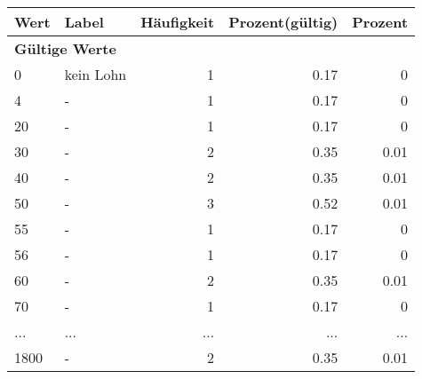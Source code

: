      \begin{longtable}{lXrrr}
     \toprule
     \textbf{Wert} & \textbf{Label} & \textbf{Häufigkeit} & \textbf{Prozent(gültig)} & \textbf{Prozent} \\
     \endhead
     \midrule
     \multicolumn{5}{l}{\textbf{Gültige Werte}}\\
        0 & \multicolumn{1}{X}{kein Lohn} & %
          \num{1} &
          \num[round-mode=places,round-precision=2]{0.17} &
          \num[round-mode=places,round-precision=2]{0} \\
        4 & \multicolumn{1}{X}{-} & %
          \num{1} &
          \num[round-mode=places,round-precision=2]{0.17} &
          \num[round-mode=places,round-precision=2]{0} \\
        20 & \multicolumn{1}{X}{-} & %
          \num{1} &
          \num[round-mode=places,round-precision=2]{0.17} &
          \num[round-mode=places,round-precision=2]{0} \\
        30 & \multicolumn{1}{X}{-} & %
          \num{2} &
          \num[round-mode=places,round-precision=2]{0.35} &
          \num[round-mode=places,round-precision=2]{0.01} \\
        40 & \multicolumn{1}{X}{-} & %
          \num{2} &
          \num[round-mode=places,round-precision=2]{0.35} &
          \num[round-mode=places,round-precision=2]{0.01} \\
        50 & \multicolumn{1}{X}{-} & %
          \num{3} &
          \num[round-mode=places,round-precision=2]{0.52} &
          \num[round-mode=places,round-precision=2]{0.01} \\
        55 & \multicolumn{1}{X}{-} & %
          \num{1} &
          \num[round-mode=places,round-precision=2]{0.17} &
          \num[round-mode=places,round-precision=2]{0} \\
        56 & \multicolumn{1}{X}{-} & %
          \num{1} &
          \num[round-mode=places,round-precision=2]{0.17} &
          \num[round-mode=places,round-precision=2]{0} \\
        60 & \multicolumn{1}{X}{-} & %
          \num{2} &
          \num[round-mode=places,round-precision=2]{0.35} &
          \num[round-mode=places,round-precision=2]{0.01} \\
        70 & \multicolumn{1}{X}{-} & %
          \num{1} &
          \num[round-mode=places,round-precision=2]{0.17} &
          \num[round-mode=places,round-precision=2]{0} \\
       ... & ... & ... & ... & ... \\
        1800 & \multicolumn{1}{X}{-} & %
          \num{2} &
          \num[round-mode=places,round-precision=2]{0.35} &
          \num[round-mode=places,round-precision=2]{0.01} \\


\end{longtable}
